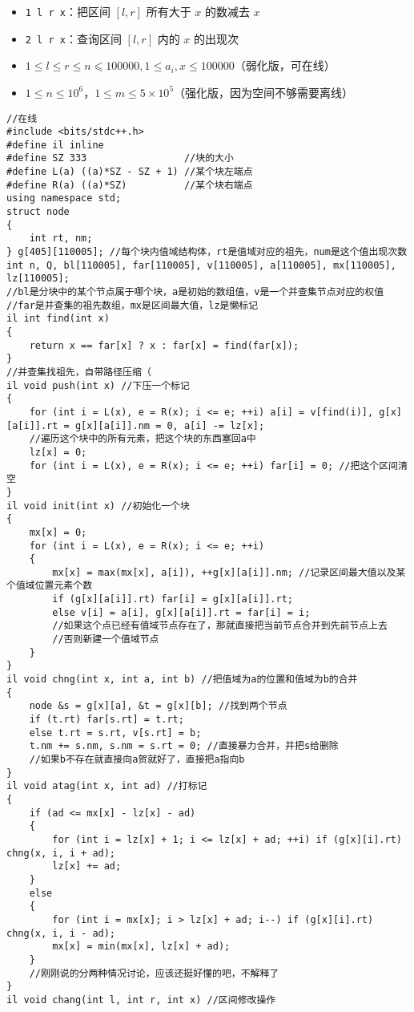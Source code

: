 \documentclass[E:/GsjzTle/main/main.tex]{subfiles}
\begin{document}
\begin{itemize}
\item
  \texttt{1\ l\ r\ x}：把区间 \([l,r]\) 所有大于 \(x\) 的数减去 \(x\)
\item
  \texttt{2\ l\ r\ x}：查询区间 \([l,r]\) 内的 \(x\) 的出现次
\item
  \(1\le l\le r\le n⩽100000,1\le a_i,x\le 100000\)（弱化版，可在线）
\item
  \(1\le n\le 10^6\)，\(1\le m\le 5\times 10^5\)（强化版，因为空间不够需要离线）
\end{itemize}

\begin{lstlisting}
//在线
#include <bits/stdc++.h>
#define il inline
#define SZ 333				   //块的大小
#define L(a) ((a)*SZ - SZ + 1) //某个块左端点
#define R(a) ((a)*SZ)		   //某个块右端点
using namespace std;
struct node
{
	int rt, nm;
} g[405][110005]; //每个块内值域结构体，rt是值域对应的祖先，num是这个值出现次数
int n, Q, bl[110005], far[110005], v[110005], a[110005], mx[110005], lz[110005];
//bl是分块中的某个节点属于哪个块，a是初始的数组值，v是一个并查集节点对应的权值
//far是并查集的祖先数组，mx是区间最大值，lz是懒标记
il int find(int x)
{
	return x == far[x] ? x : far[x] = find(far[x]);
}
//并查集找祖先，自带路径压缩（
il void push(int x) //下压一个标记
{
	for (int i = L(x), e = R(x); i <= e; ++i) a[i] = v[find(i)], g[x][a[i]].rt = g[x][a[i]].nm = 0, a[i] -= lz[x];
	//遍历这个块中的所有元素，把这个块的东西塞回a中
	lz[x] = 0;
	for (int i = L(x), e = R(x); i <= e; ++i) far[i] = 0; //把这个区间清空
}
il void init(int x) //初始化一个块
{
	mx[x] = 0;
	for (int i = L(x), e = R(x); i <= e; ++i)
	{
		mx[x] = max(mx[x], a[i]), ++g[x][a[i]].nm; //记录区间最大值以及某个值域位置元素个数
		if (g[x][a[i]].rt) far[i] = g[x][a[i]].rt;
		else v[i] = a[i], g[x][a[i]].rt = far[i] = i;
		//如果这个点已经有值域节点存在了，那就直接把当前节点合并到先前节点上去
		//否则新建一个值域节点
	}
}
il void chng(int x, int a, int b) //把值域为a的位置和值域为b的合并
{
	node &s = g[x][a], &t = g[x][b]; //找到两个节点
	if (t.rt) far[s.rt] = t.rt;
	else t.rt = s.rt, v[s.rt] = b;
	t.nm += s.nm, s.nm = s.rt = 0; //直接暴力合并，并把s给删除
	//如果b不存在就直接向a贺就好了，直接把a指向b
}
il void atag(int x, int ad) //打标记
{
	if (ad <= mx[x] - lz[x] - ad)
	{
		for (int i = lz[x] + 1; i <= lz[x] + ad; ++i) if (g[x][i].rt) chng(x, i, i + ad);
		lz[x] += ad;
	}
	else
	{
		for (int i = mx[x]; i > lz[x] + ad; i--) if (g[x][i].rt) chng(x, i, i - ad);
		mx[x] = min(mx[x], lz[x] + ad);
	}
	//刚刚说的分两种情况讨论，应该还挺好懂的吧，不解释了
}
il void chang(int l, int r, int x) //区间修改操作

\end{lstlisting}
\end{document}
